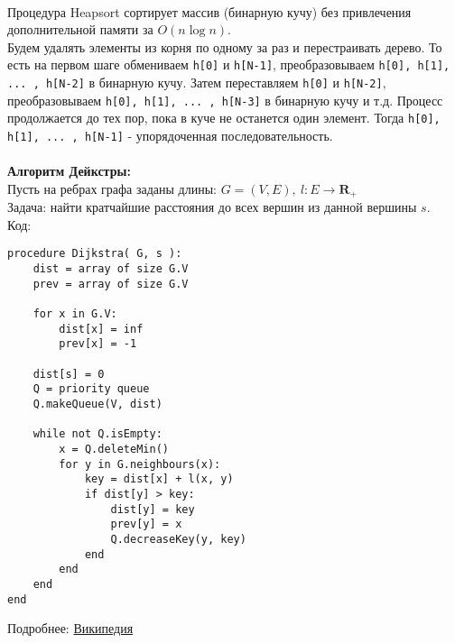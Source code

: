 \\
Процедура Heapsort сортирует массив (бинарную кучу) без привлечения дополнительной памяти за
$O(n \log n)$.\\
Будем удалять элементы из корня по одному за раз и перестраивать дерево. То есть на первом шаге обмениваем \texttt{h[0]} и \texttt{h[N-1]}, преобразовываем \texttt{h[0], h[1], ... , h[N-2]} в бинарную кучу. Затем переставляем \texttt{h[0]} и \texttt{h[N-2]}, преобразовываем \texttt{h[0], h[1], ... , h[N-3]} в бинарную кучу и т.д. Процесс продолжается до тех пор, пока в куче не останется один элемент. Тогда \texttt{h[0], h[1], ... , h[N-1]} - упорядоченная последовательность.\\
\\
{\bf Алгоритм Дейкстры:}\\
Пусть на ребрах графа заданы длины: $G = (V, E),\ l : E \rightarrow \mathbf{R}_{+}$\\
Задача: найти кратчайшие расстояния до всех вершин из данной вершины $s$.\\
Код:
\begin{verbatim}
procedure Dijkstra( G, s ):
    dist = array of size G.V
    prev = array of size G.V

    for x in G.V:
        dist[x] = inf
        prev[x] = -1

    dist[s] = 0
    Q = priority queue
    Q.makeQueue(V, dist)

    while not Q.isEmpty:
        x = Q.deleteMin()
        for y in G.neighbours(x):
            key = dist[x] + l(x, y)
            if dist[y] > key:
                dist[y] = key
                prev[y] = x
                Q.decreaseKey(y, key)
            end
        end
    end
end
\end{verbatim}
Подробнее: \href{https://ru.wikipedia.org/wiki/Алгоритм_Дейкстры}{Википедия}
